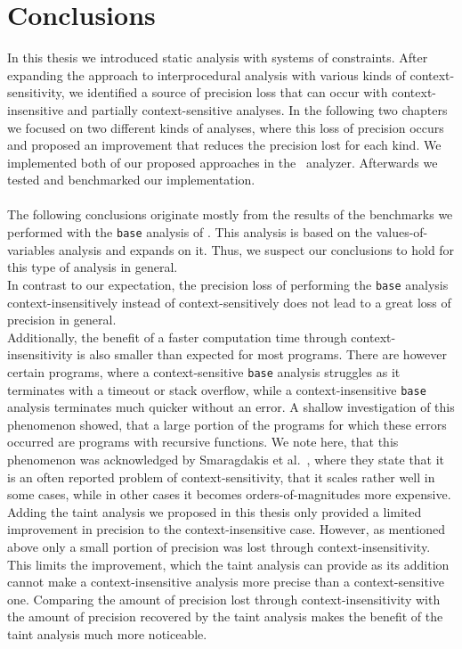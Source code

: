 
\chapter{Conclusions}\label{chapter:conclusions}
  In this thesis we introduced static analysis with systems of constraints. After expanding the approach to interprocedural analysis with various kinds of context-sensitivity, we identified a source of precision loss that can occur with context-insensitive and partially context-sensitive analyses. In the following two chapters we focused on two different kinds of analyses, where this loss of precision occurs and proposed an improvement that reduces the precision lost for each kind. We implemented both of our proposed approaches in the \gob\ analyzer. Afterwards we tested and benchmarked our implementation.\\
  \\
  The following conclusions originate mostly from the results of the benchmarks we performed with the \texttt{base} analysis of \gob. This analysis is based on the values-of-variables analysis and expands on it. Thus, we suspect our conclusions to hold for this type of analysis in general.\\
  In contrast to our expectation, the precision loss of performing the \texttt{base} analysis context-insensitively instead of context-sensitively does not lead to a great loss of precision in general.\\
  Additionally, the benefit of a faster computation time through context-insensitivity is also smaller than expected for most programs. There are however certain programs, where a context-sensitive \texttt{base} analysis struggles as it terminates with a timeout or stack overflow, while a context-insensitive \texttt{base} analysis terminates much quicker without an error. A shallow investigation of this phenomenon showed, that a large portion of the programs for which these errors occurred are programs with recursive functions. We note here, that this phenomenon was acknowledged by Smaragdakis et al.~\parencite{smaragdakis2014introspective}, where they state that it is an often reported problem of context-sensitivity, that it scales rather well in some cases, while in other cases it becomes orders-of-magnitudes more expensive.\\  
  Adding the taint analysis we proposed in this thesis only provided a limited improvement in precision to the context-insensitive case. However, as mentioned above only a small portion of precision was lost through context-insensitivity. This limits the improvement, which the taint analysis can provide as its addition cannot make a context-insensitive analysis more precise than a context-sensitive one. Comparing the amount of precision lost through context-insensitivity with the amount of precision recovered by the taint analysis makes the benefit of the taint analysis much more noticeable.\\
